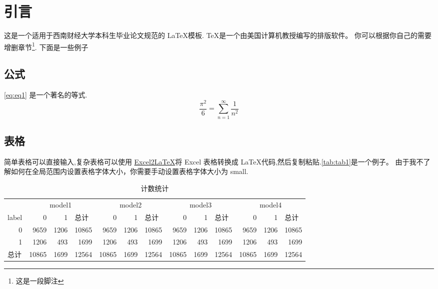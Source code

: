 \section{引言}
这是一个适用于西南财经大学本科生毕业论文规范的 \LaTeX \cite{lamport1994latex,goossens1994latex}模板.
\TeX 是一个由美国计算机教授\citet{knuth1984texbook}编写的排版软件。
你可以根据你自己的需要增删章节\footnote{这是一段脚注}. 下面是一些例子

\subsection{公式}
\autoref{eq:eq1} 是一个著名的等式.
\begin{equation}\label{eq:eq1}
    \frac{\pi^2}{6}=\sum_{n=1}^{\infty}\frac{1}{n^2}
\end{equation}
\subsection{表格}
简单表格可以直接输入,复杂表格可以使用 \href{https://github.com/krlmlr/Excel2LaTeX}{Excel2LaTeX}将 Excel 表格转换成 \LaTeX 代码,然后复制粘贴.\autoref{tab:tab1}是一个例子。 由于我不了解如何在全局范围内设置表格字体大小，你需要手动设置表格字体大小为 small.
\begin{table}[htbp]
    \centering
    \small
    \caption{计数统计}
      \begin{tabular}{|l|rrr|rrr|rrr|rrr|}
      \hline
        & \multicolumn{3}{c|}{model1} & \multicolumn{3}{c|}{model2} & \multicolumn{3}{c|}{model3} & \multicolumn{3}{c|}{model4} \bigstrut\\
  \cline{2-13}    label & 0 & 1 & \multicolumn{1}{l|}{总计} & 0 & 1 & \multicolumn{1}{l|}{总计} & 0 & 1 & \multicolumn{1}{l|}{总计} & 0 & 1 & \multicolumn{1}{l|}{总计} \bigstrut\\
      \hline
      \multicolumn{1}{|r|}{0} & 9659 & 1206 & 10865 & 9659 & 1206 & 10865 & 9659 & 1206 & 10865 & 9659 & 1206 & 10865 \bigstrut[t]\\
      \multicolumn{1}{|r|}{1} & 1206 & 493 & 1699 & 1206 & 493 & 1699 & 1206 & 493 & 1699 & 1206 & 493 & 1699 \\
      总计 & 10865 & 1699 & 12564 & 10865 & 1699 & 12564 & 10865 & 1699 & 12564 & 10865 & 1699 & 12564 \bigstrut[b]\\
      \hline
      \end{tabular}%
    \label{tab:tab1}%
  \end{table}%
  
